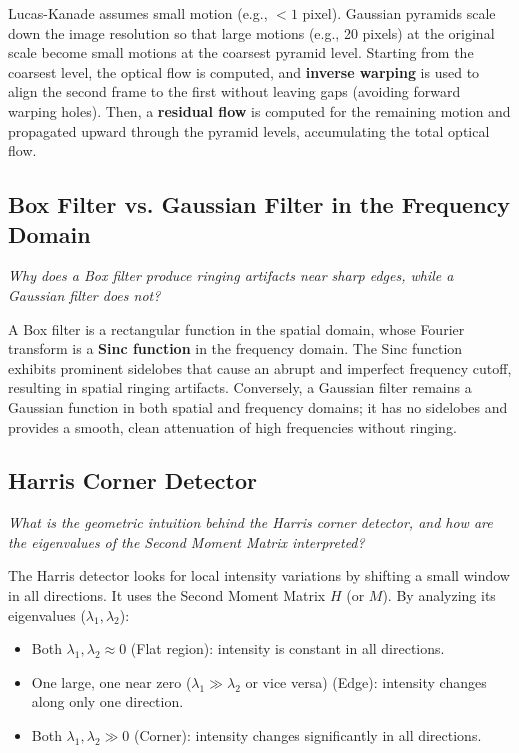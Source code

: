 Lucas-Kanade assumes small motion (e.g., $< 1$ pixel). Gaussian pyramids scale down the image resolution so that large motions (e.g., 20 pixels) at the original scale become small motions at the coarsest pyramid level. Starting from the coarsest level, the optical flow is computed, and \textbf{inverse warping} is used to align the second frame to the first without leaving gaps (avoiding forward warping holes). Then, a \textbf{residual flow} is computed for the remaining motion and propagated upward through the pyramid levels, accumulating the total optical flow.

\subsection{Box Filter vs. Gaussian Filter in the Frequency Domain}
\textit{Why does a Box filter produce ringing artifacts near sharp edges, while a Gaussian filter does not?}

A Box filter is a rectangular function in the spatial domain, whose Fourier transform is a \textbf{Sinc function} in the frequency domain. The Sinc function exhibits prominent sidelobes that cause an abrupt and imperfect frequency cutoff, resulting in spatial ringing artifacts. Conversely, a Gaussian filter remains a Gaussian function in both spatial and frequency domains; it has no sidelobes and provides a smooth, clean attenuation of high frequencies without ringing.

\subsection{Harris Corner Detector}
\textit{What is the geometric intuition behind the Harris corner detector, and how are the eigenvalues of the Second Moment Matrix interpreted?}

The Harris detector looks for local intensity variations by shifting a small window in all directions. It uses the Second Moment Matrix $H$ (or $M$). By analyzing its eigenvalues ($\lambda_1, \lambda_2$):
\begin{itemize}
    \item Both $\lambda_1, \lambda_2 \approx 0$ (Flat region): intensity is constant in all directions.
    \item One large, one near zero ($\lambda_1 \gg \lambda_2$ or vice versa) (Edge): intensity changes along only one direction.
    \item Both $\lambda_1, \lambda_2 \gg 0$ (Corner): intensity changes significantly in all directions.
\end{itemize}

